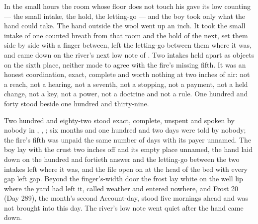 In the small hours the room whose floor does not touch his gave its low counting --- the small intake, the hold, the letting-go --- and the boy took only what the hand could take. The hand outside the wool went up an inch. It took the small intake of one counted breath from that room and the hold of the next, set them side by side with a finger between, left the letting-go between them where it was, and came down on the river's next low note of . Two intakes held apart as objects on the sixth place, neither made to agree with the fire's missing fifth. It was an honest coordination, exact, complete and worth nothing at two inches of air: not a reach, not a hearing, not a seventh, not a stopping, not a payment, not a held change, not a key, not a power, not a doctrine and not a rule. One hundred and forty stood beside one hundred and thirty-nine.

Two hundred and eighty-two stood exact, complete, unspent and spoken by nobody in , , ; six months and one hundred and two days were told by nobody; the fire's fifth was unpaid the same number of days with its payer unnamed. The boy lay with the crust two inches off and its empty place unnamed, the hand laid down on the hundred and fortieth answer and the letting-go between the two intakes left where it was, and the file open on  at the head of the bed with every gap left gap. Beyond the finger's-width door the frost lay white on the well lip where the yard had left it, called weather and entered nowhere, and Frost 20 (Day 289), the month's second Account-day, stood five mornings ahead and was not brought into this day. The river's low note went quiet after the hand came down.
